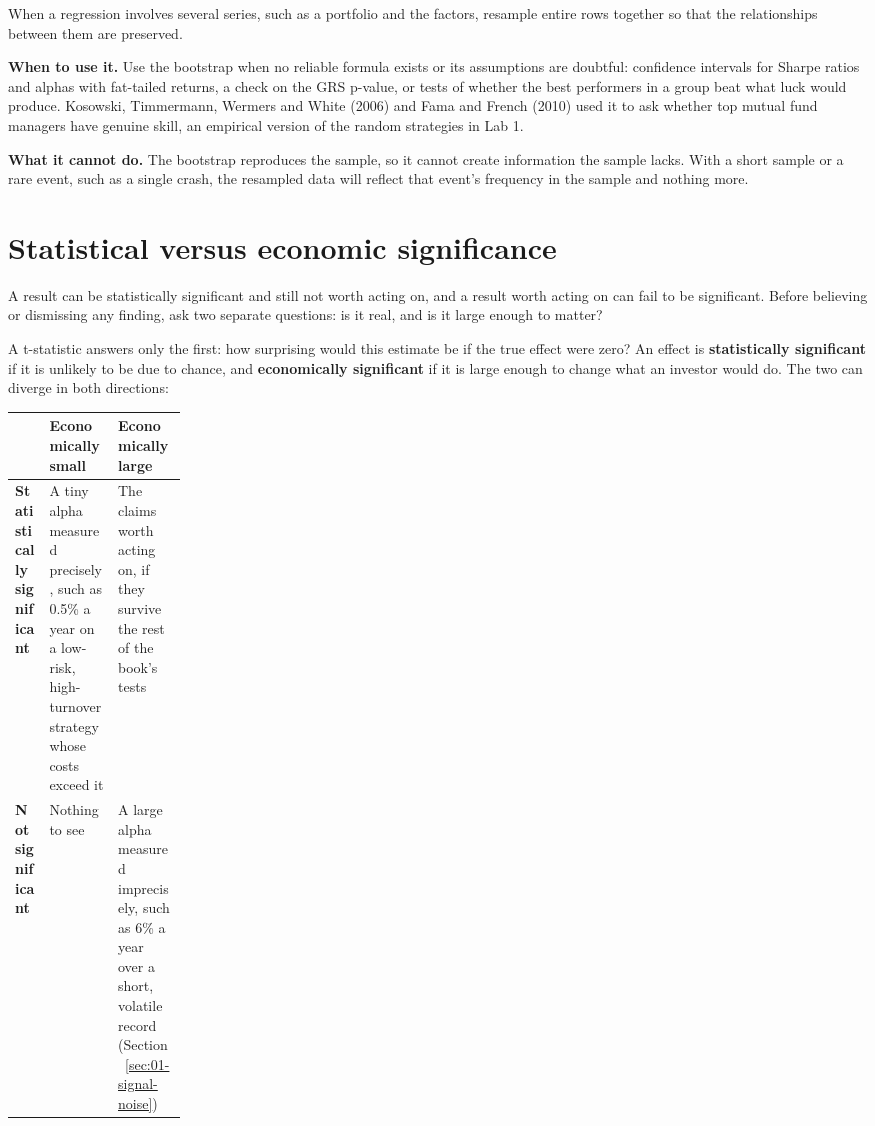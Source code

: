 When a regression involves several series, such as a portfolio and the factors,
resample entire rows together so that the relationships between them are
preserved.

\textbf{When to use it.} Use the bootstrap when no reliable formula exists or
its assumptions are doubtful: confidence intervals for Sharpe ratios and alphas
with fat-tailed returns, a check on the GRS p-value, or tests of whether the
best performers in a group beat what luck would produce. Kosowski, Timmermann,
Wermers and White (2006) and Fama and French (2010) used it to ask whether top
mutual fund managers have genuine skill, an empirical version of the random
strategies in Lab 1.

\textbf{What it cannot do.} The bootstrap reproduces the sample, so it cannot
create information the sample lacks. With a short sample or a rare event, such
as a single crash, the resampled data will reflect that event's frequency in
the sample and nothing more.

\section{Statistical versus economic significance}
\label{sec:03-economic}

A result can be statistically significant and still not worth acting on, and a
result worth acting on can fail to be significant. Before believing or
dismissing any finding, ask two separate questions: is it real, and is it
large enough to matter?

A t-statistic answers only the first: how surprising would this estimate be if
the true effect were zero? An effect is \textbf{statistically significant} if it
is unlikely to be due to chance, and \textbf{economically significant} if it is
large enough to change what an investor would do. The two can diverge in both
directions:

\begin{center}
\small
\begin{tabularx}{0.9\linewidth}{@{}>{\raggedright\arraybackslash}p{0.20\linewidth}>{\raggedright\arraybackslash}X>{\raggedright\arraybackslash}X@{}}
\toprule
 & Economically small & Economically large \\
\midrule
\textbf{Statistically significant} & A tiny alpha measured precisely, such as 0.5\% a year on a low-risk, high-turnover strategy whose costs exceed it & The claims worth acting on, if they survive the rest of the book's tests \\
\textbf{Not significant} & Nothing to see & A large alpha measured imprecisely, such as 6\% a year over a short, volatile record (Section~\ref{sec:01-signal-noise}) \\
\bottomrule
\end{tabularx}
\end{center}

